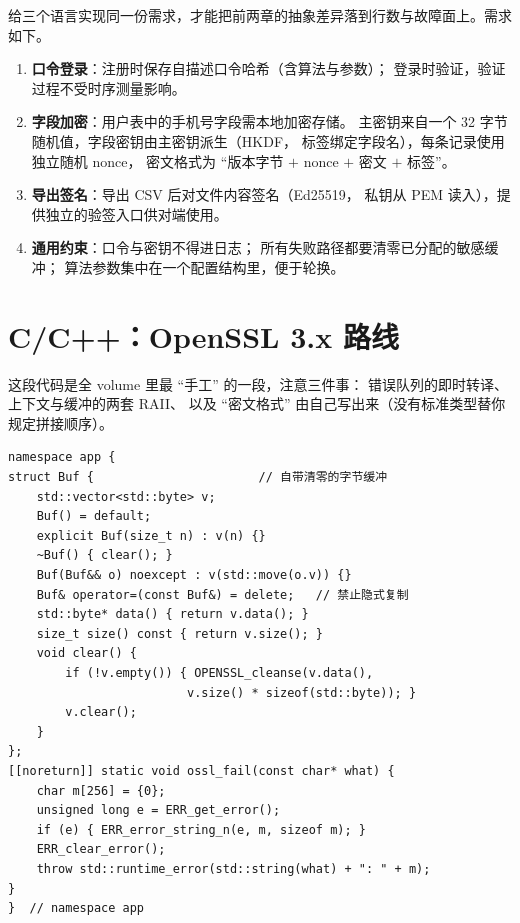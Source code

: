 \documentclass[12pt,a4paper,fontset=fandol]{ctexbook}
\newcommand{\CppJava}{C/C++}
\begin{document}
给三个语言实现同一份需求，才能把前两章的抽象差异落到行数与故障面上。需求如下。

\begin{guideline}[title=需求 6-A：本地端凭据与数据保护]
\begin{enumerate}
  \item \textbf{口令登录}：注册时保存自描述口令哈希（含算法与参数）；
        登录时验证，验证过程不受时序测量影响。
  \item \textbf{字段加密}：用户表中的手机号字段需本地加密存储。
        主密钥来自一个 32 字节随机值，字段密钥由主密钥派生（HKDF，
        标签绑定字段名），每条记录使用独立随机 nonce，
        密文格式为 ``版本字节 $+$ nonce $+$ 密文 $+$ 标签''。
  \item \textbf{导出签名}：导出 CSV 后对文件内容签名（Ed25519，
        私钥从 PEM 读入），提供独立的验签入口供对端使用。
  \item \textbf{通用约束}：口令与密钥不得进日志；
        所有失败路径都要清零已分配的敏感缓冲；
        算法参数集中在一个配置结构里，便于轮换。
\end{enumerate}
\end{guideline}

\section{\CppJava{}：OpenSSL 3.x 路线}

这段代码是全 volume 里最 ``手工'' 的一段，注意三件事：
错误队列的即时转译、上下文与缓冲的两套 RAII、
以及 ``密文格式'' 由自己写出来（没有标准类型替你规定拼接顺序）。

\begin{lstlisting}[caption={C/C++：敏感缓冲与全局入口}]
namespace app {
struct Buf {                       // 自带清零的字节缓冲
    std::vector<std::byte> v;
    Buf() = default;
    explicit Buf(size_t n) : v(n) {}
    ~Buf() { clear(); }
    Buf(Buf&& o) noexcept : v(std::move(o.v)) {}
    Buf& operator=(const Buf&) = delete;   // 禁止隐式复制
    std::byte* data() { return v.data(); }
    size_t size() const { return v.size(); }
    void clear() {
        if (!v.empty()) { OPENSSL_cleanse(v.data(),
                         v.size() * sizeof(std::byte)); }
        v.clear();
    }
};
[[noreturn]] static void ossl_fail(const char* what) {
    char m[256] = {0};
    unsigned long e = ERR_get_error();
    if (e) { ERR_error_string_n(e, m, sizeof m); }
    ERR_clear_error();
    throw std::runtime_error(std::string(what) + ": " + m);
}
}  // namespace app
\end{lstlisting}
\end{document}
